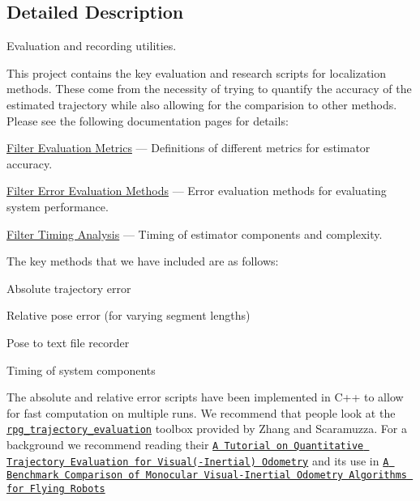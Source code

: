 \subsection{Detailed Description}
Evaluation and recording utilities. 

This project contains the key evaluation and research scripts for localization methods. These come from the necessity of trying to quantify the accuracy of the estimated trajectory while also allowing for the comparision to other methods. Please see the following documentation pages for details\+:


\begin{DoxyItemize}
\item \hyperlink{eval-metrics}{Filter Evaluation Metrics} --- Definitions of different metrics for estimator accuracy.
\item \hyperlink{eval-error}{Filter Error Evaluation Methods} --- Error evaluation methods for evaluating system performance.
\item \hyperlink{eval-timing}{Filter Timing Analysis} --- Timing of estimator components and complexity.
\end{DoxyItemize}

The key methods that we have included are as follows\+:


\begin{DoxyItemize}
\item Absolute trajectory error
\item Relative pose error (for varying segment lengths)
\item Pose to text file recorder
\item Timing of system components
\end{DoxyItemize}

The absolute and relative error scripts have been implemented in C++ to allow for fast computation on multiple runs. We recommend that people look at the \href{https://github.com/uzh-rpg/rpg_trajectory_evaluation}{\tt rpg\+\_\+trajectory\+\_\+evaluation} toolbox provided by Zhang and Scaramuzza. For a background we recommend reading their \href{http://rpg.ifi.uzh.ch/docs/IROS18_Zhang.pdf}{\tt A Tutorial on Quantitative Trajectory Evaluation for Visual(-\/\+Inertial) Odometry} \cite{Zhang2018IROS} and its use in \href{http://rpg.ifi.uzh.ch/docs/ICRA18_Delmerico.pdf}{\tt A Benchmark Comparison of Monocular Visual-\/\+Inertial Odometry Algorithms for Flying Robots} \cite{Delmerico2018ICRA} 